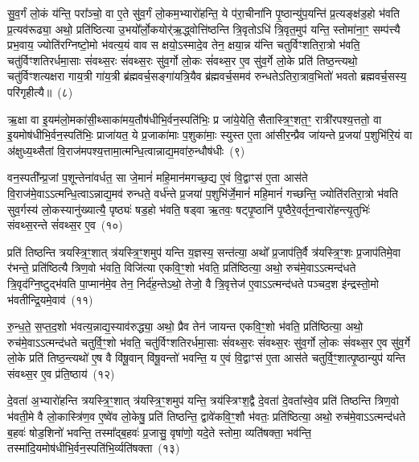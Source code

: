 सु॒व॒र्गं लो॒कं य॑न्ति॒ परा᳚ञ्चो॒ वा ए॒ते सु॑व॒र्गं लो॒कम॒भ्यारो॑हन्ति॒ ये प॑रा॒चीना॑नि पृ॒ष्ठान्यु॑प॒यन्ति॑ प्र॒त्यङ्क्ष॑ड॒हो भ॑वति प्र॒त्यव॑रूढ्या॒ अथो॒ प्रति॑ष्ठित्या उ॒भयो᳚र्लो॒कयोर्॑\mbox{}ऋ॒द्ध्वोत्ति॑ष्ठन्ति त्रि॒वृतो\-ऽधि॑ त्रि॒वृत॒मुप॑ यन्ति॒ स्तोमा॑ना॒ꣳ॒ सम्प॑त्त्यै प्रभ॒वाय॒ ज्योति॑रग्निष्टो॒मो भ॑वत्य॒यं वाव स क्षयो॒\-ऽस्मादे॒व तेन॒ क्षया॒न्न य॑न्ति चतुर्विꣳशतिरा॒त्रो भ॑वति॒ चतु॑र्विꣳशतिरर्धमा॒साः सं॑वथ्स॒रः सं॑वथ्स॒रः सु॑व॒र्गो लो॒कः सं॑वथ्स॒र ए॒व सु॑व॒र्गे लो॒के प्रति॑ तिष्ठ॒न्त्यथो॒ चतु॑र्विꣳशत्यक्षरा गाय॒त्री गा॑य॒त्री ब्र॑ह्मवर्च॒सङ्गा॑यत्रि॒यैव ब्र॑ह्मवर्च॒समव॑ रुन्धते\-ऽतिरा॒त्राव॒भितो॑ भवतो ब्रह्मवर्च॒सस्य॒ परि॑गृहीत्यै॥~(८)\ip

{\anuvakamend[{म॒नु॒ष्य॑स्य मध्य॒तः प॒शव॒स्ताभ्या॑मे॒व सं॑वथ्स॒रश्चतु॑र्विꣳशतिश्च}]}

ऋ॒क्षा वा इ॒यम॑लो॒मका॑सी॒थ्साका॑मय॒तौष॑धीभि॒र्वन॒स्पति॑भिः॒ प्र जा॑ये॒येति॒ सैतास्त्रि॒ꣳ॒शत॒ꣳ॒ रात्री॑रपश्य॒त्ततो॒ वा इ॒यमोष॑धीभि॒र्वन॒स्पति॑भिः॒ प्राजा॑यत॒ ये प्र॒जाका॑माः प॒शुका॑माः॒ स्युस्त ए॒ता आ॑सीर॒न्प्रैव जा॑यन्ते प्र॒जया॑ प॒शुभि॑रि॒यं वा अ॑क्षुध्य॒थ्सैतां वि॒राज॑मपश्य॒त्तामा॒त्मन्धि॒त्वान्नाद्य॒मवा॑रु॒न्धौष॑धीः~(९)\ip

वन॒स्पती᳚न्प्र॒जां प॒शून्तेना॑वर्धत॒ सा जे॒मानं॑ महि॒मान॑मगच्छ॒द्य ए॒वं वि॒द्वाꣳस॑ ए॒ता आस॑ते वि॒राज॑मे॒वा\-ऽऽ\-त्मन्धि॒त्वा\-ऽन्नाद्य॒मव॑ रुन्धते॒ वर्ध॑न्ते प्र॒जया॑ प॒शुभि॑र्जे॒मानं॑ महि॒मानं॑ गच्छन्ति॒ ज्योति॑रतिरा॒त्रो भ॑वति सुव॒र्गस्य॑ लो॒कस्यानु॑\-ख्यात्यै॒ पृष्ठ्यः॑ षड॒हो भ॑वति॒ षड्वा ऋ॒तवः॒ षट्पृ॒ष्ठानि॑ पृ॒ष्ठैरे॒वर्तून॒न्वारो॑हन्त्यृ॒तुभिः॑ संवथ्स॒रन्ते सं॑वथ्स॒र ए॒व~(१०)\ip

प्रति॑ तिष्ठन्ति त्रयस्त्रि॒ꣳ॒शात् त्र॑यस्त्रि॒ꣳ॒शमुप॑ यन्ति य॒ज्ञस्य॒ सन्त॑त्या॒ अथो᳚ प्र॒जा\-प॑ति॒र्वै त्र॑यस्त्रि॒ꣳ॒शः प्र॒जा\-प॑तिमे॒वा र॑भन्ते॒ प्रति॑ष्ठित्यै त्रिण॒वो भ॑वति॒ विजि॑त्या एकवि॒ꣳ॒शो भ॑वति॒ प्रति॑ष्ठित्या॒ अथो॒ रुच॑मे॒वा\-ऽऽ\-त्मन्द॑धते त्रि॒वृद॑ग्नि॒ष्टुद्भ॑वति पा॒प्मान॑मे॒व तेन॒ निर्द॑ह॒न्ते\-ऽथो॒ तेजो॒ वै त्रि॒वृत्तेज॑ ए॒वा\-ऽऽ\-त्मन्द॑धते पञ्चद॒श इ॑न्द्रस्तो॒मो भ॑वतीन्द्रि॒यमे॒वाव॑~(११)\ip

रु॒न्ध॒ते॒ स॒प्त॒द॒शो भ॑वत्य॒न्नाद्य॒स्याव॑रुद्ध्या॒ अथो॒ प्रैव तेन॑ जायन्त एकवि॒ꣳ॒शो भ॑वति॒ प्रति॑ष्ठित्या॒ अथो॒ रुच॑मे॒वा\-ऽऽ\-त्मन्द॑धते चतुर्वि॒ꣳ॒शो भ॑वति॒ चतु॑र्विꣳशतिरर्धमा॒साः सं॑वथ्स॒रः सं॑वथ्स॒रः सु॑व॒र्गो लो॒कः सं॑वथ्स॒र ए॒व सु॑व॒र्गे लो॒के प्रति॑ तिष्ठ॒न्त्यथो॑ ए॒ष वै वि॑षू॒वान् वि॑षू॒वन्तो॑ भवन्ति॒ य ए॒वं वि॒द्वाꣳस॑ ए॒ता आस॑ते चतुर्वि॒ꣳ॒शात्पृ॒ष्ठान्युप॑ यन्ति संवथ्स॒र ए॒व प्र॑ति॒ष्ठाय॑~(१२)\ip

दे॒वता॑ अ॒भ्यारो॑हन्ति त्रयस्त्रि॒ꣳ॒शात् त्र॑यस्त्रि॒ꣳ॒शमुप॑ यन्ति॒ त्रय॑स्त्रिꣳश॒द्वै दे॒वता॑ दे॒वता᳚स्वे॒व प्रति॑ तिष्ठन्ति त्रिण॒वो भ॑वती॒मे वै लो॒कास्त्रि॑ण॒व ए॒ष्वे॑व लो॒केषु॒ प्रति॑ तिष्ठन्ति॒ द्वावे॑कवि॒ꣳ॒शौ भ॑वतः॒ प्रति॑ष्ठित्या॒ अथो॒ रुच॑मे॒वा\-ऽऽ\-त्मन्द॑धते ब॒हवः॑ षोड॒शिनो॑ भवन्ति॒ तस्मा᳚द्\-ब॒हवः॑ प्र॒जासु॒ वृषा॑णो॒ यदे॒ते स्तोमा॒ व्यति॑षक्ता॒ भव॑न्ति॒ तस्मा॑दि॒यमोष॑धीभि॒र्वन॒स्पति॑भि॒र्व्यति॑षक्ता~(१३)\ip


